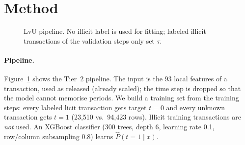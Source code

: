 \documentclass[11pt]{article}
\newcommand{\ours}{LvU}
\begin{document}
\section{Method}
\label{sec:method}

\begin{figure}[t]
\centering
{}
\caption{\ours{} pipeline. No illicit label is used for fitting; labeled illicit transactions of the validation steps only set $\tau$.}
\label{fig:pipeline}
\end{figure}

\paragraph{Pipeline.}
Figure~\ref{fig:pipeline} shows the Tier~2 pipeline.
The input is the 93 local features of a transaction, used as released (already scaled); the time step is dropped so that the model cannot memorise periods.
We build a training set from the training steps: every labeled licit transaction gets target $t=0$ and every unknown transaction gets $t=1$ (23,510 vs.\ 94,423 rows).
Illicit training transactions are \emph{not} used.
An XGBoost classifier (300 trees, depth 6, learning rate 0.1, row/column subsampling 0.8) learns $\hat{P}(t{=}1\mid x)$.
\end{document}

